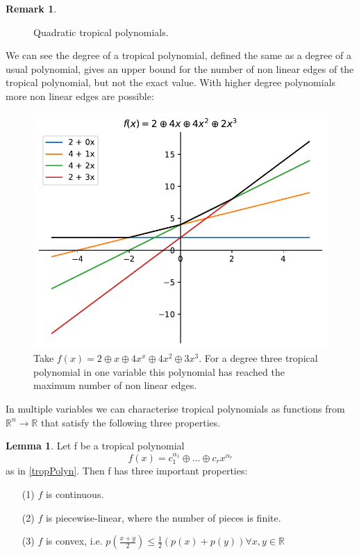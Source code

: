 \documentclass{article}
\theoremstyle{definition}
\newtheorem{lemma}[theorem]{Lemma}
\newtheorem{example}[theorem]{Remark}
\begin{document}
\begin{example}
\begin{figure}[h]
\caption{Quadratic tropical polynomials.}
\label{fig:image2}
\end{figure}

We can see the degree of a tropical polynomial, defined the same as a degree of a usual polynomial, gives an upper bound for the number of non linear edges of the tropical polynomial, but not the exact value. With higher degree polynomials more non linear edges are possible:


\begin{figure}[H]
\centering
\includegraphics[scale=0.75]{graphics/third_trop_pol.pdf}
\caption{Take $f(x)=2 \oplus x \oplus 4x^{x} \oplus 4x^{2} \oplus 3x^{3}$. For a degree three tropical polynomial in one variable this polynomial has reached the maximum number of non linear edges.}
\label{fig:fs_mi}
\end{figure}


\end{example}

In multiple variables we can characterise tropical polynomials as functions from $\mathbb{R}^{n} \to \mathbb{R}$ that satisfy the following three properties.

\begin{lemma}\label{lemma:trop_properties}
Let f be a tropical polynomial
$$ f(x) = c_1^{\alpha_1} \oplus \dots \oplus c_r x^{\alpha_r}$$ as in \ref{tropPolyn}. Then f has three important properties:
\begin{itemize}
\item[(1)]
$f$ is continuous.
\item[(2)]
$f$ is piecewise-linear, where the number of pieces is finite.
\item[(3)]
$f$ is convex, i.e. $p(\frac{x + y}{2}) \leq \frac{1}{2}(p(x)+p(y)) \forall x,y \in \mathbb{R}$
\end{itemize}
\end{lemma}
\end{document}

